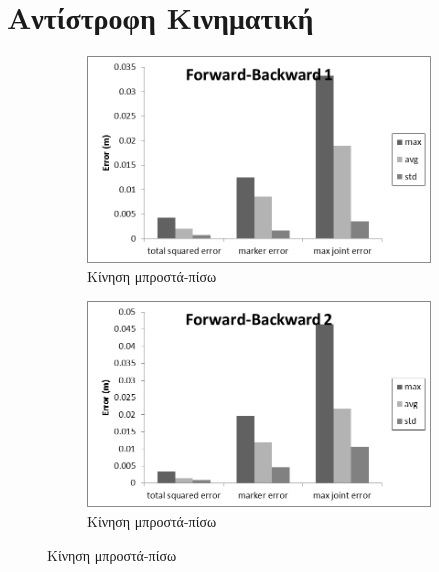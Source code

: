 \section{Αντίστροφη Κινηματική}

\begin{figure}[H]
    \centering
    \begin{subfigure}[t]{.48\textwidth}
        \includegraphics[width=\textwidth, keepaspectratio]{fig/ik-reg1.png}
        \caption{Κίνηση μπροστά-πίσω}
        \label{fig:forth-back1}
    \end{subfigure}
    \begin{subfigure}[t]{.48\textwidth}
        \includegraphics[width=\textwidth, keepaspectratio]{fig/ik-reg2.png}
        \caption{Κίνηση μπροστά-πίσω}
        \label{fig:forth-back2}
    \end{subfigure}


\end{figure}
